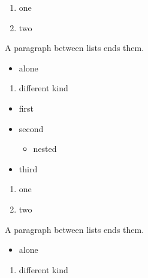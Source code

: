 \begin{enumerate}
\item one
\item two
\end{enumerate}

A paragraph between lists ends them.

\begin{itemize}
\item alone
\end{itemize}

\begin{enumerate}
\item different kind
\end{enumerate}
\begin{frame}[t]
\begin{itemize}
\item first
\item second

\begin{itemize}
\item nested
\end{itemize}
\item third
\end{itemize}

\begin{enumerate}
\item one
\item two
\end{enumerate}

A paragraph between lists ends them.

\begin{itemize}
\item alone
\end{itemize}

\begin{enumerate}
\item different kind
\end{enumerate}
\end{frame}

